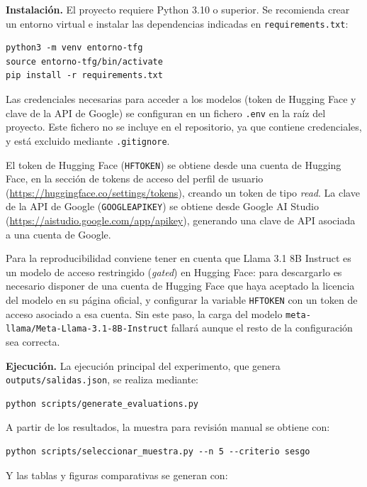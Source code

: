 \documentclass[12pt]{report} %
\renewcommand{\_}{\oldunderscore\allowbreak}
\begin{document}
\textbf{Instalación.} El proyecto requiere Python 3.10 o superior. Se recomienda crear un entorno virtual e instalar las dependencias indicadas en \texttt{requirements.txt}:

\begin{verbatim}
python3 -m venv entorno-tfg
source entorno-tfg/bin/activate
pip install -r requirements.txt
\end{verbatim}

Las credenciales necesarias para acceder a los modelos (token de Hugging Face y clave de la API de Google) se configuran en un fichero \texttt{.env} en la raíz del proyecto. Este fichero no se incluye en el repositorio, ya que contiene credenciales, y está excluido mediante \texttt{.gitignore}.

El token de Hugging Face (\texttt{HF\_TOKEN}) se obtiene desde una cuenta de Hugging Face, en la sección de tokens de acceso del perfil de usuario (\url{https://huggingface.co/settings/tokens}), creando un token de tipo \textit{read}. La clave de la API de Google (\texttt{GOOGLE\_API\_KEY}) se obtiene desde Google AI Studio (\url{https://aistudio.google.com/app/apikey}), generando una clave de API asociada a una cuenta de Google.

Para la reproducibilidad conviene tener en cuenta que Llama 3.1 8B Instruct es un modelo de acceso restringido (\textit{gated}) en Hugging Face: para descargarlo es necesario disponer de una cuenta de Hugging Face que haya aceptado la licencia del modelo en su página oficial, y configurar la variable \texttt{HF\_TOKEN} con un token de acceso asociado a esa cuenta. Sin este paso, la carga del modelo \texttt{meta-llama/Meta-Llama-3.1-8B-Instruct} fallará aunque el resto de la configuración sea correcta.

\textbf{Ejecución.} La ejecución principal del experimento, que genera \texttt{outputs/salidas.json}, se realiza mediante:

\begin{verbatim}
python scripts/generate_evaluations.py
\end{verbatim}

A partir de los resultados, la muestra para revisión manual se obtiene con:

\begin{verbatim}
python scripts/seleccionar_muestra.py --n 5 --criterio sesgo
\end{verbatim}

Y las tablas y figuras comparativas se generan con:
\end{document}
